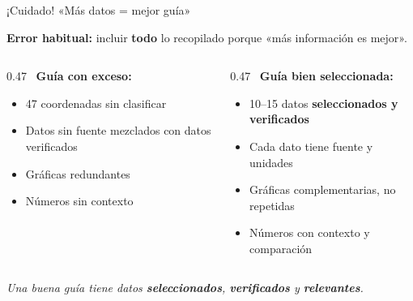 \documentclass[aspectratio=169, 10pt, spanish]{beamer}
\begin{document}
\begin{frame}{¡Cuidado! «Más datos = mejor guía»}
  \begin{errorbox}
    \textbf{Error habitual:} incluir \textbf{todo} lo recopilado porque «más información es mejor».

    \vspace{0.3cm}
    \begin{columns}[t]
      \begin{column}{0.47\textwidth}
        \incorrecto\ \textbf{Guía con exceso:}
        \begin{itemize}
          \item 47 coordenadas sin clasificar
          \item Datos sin fuente mezclados con datos verificados
          \item Gráficas redundantes
          \item Números sin contexto
        \end{itemize}
      \end{column}
      \begin{column}{0.47\textwidth}
        \correcto\ \textbf{Guía bien seleccionada:}
        \begin{itemize}
          \item 10--15 datos \textbf{seleccionados y verificados}
          \item Cada dato tiene fuente y unidades
          \item Gráficas complementarias, no repetidas
          \item Números con contexto y comparación
        \end{itemize}
      \end{column}
    \end{columns}
    \vspace{0.2cm}
    \begin{center}
      \textit{Una buena guía tiene datos \textbf{seleccionados}, \textbf{verificados} y \textbf{relevantes}.}
    \end{center}
  \end{errorbox}
\end{frame}
\end{document}
